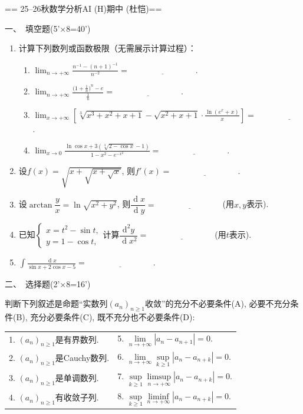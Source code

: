 == 25--26秋数学分析AI (H)期中 (杜恺)==

一、\ 填空题(5'×8=40')
\begin{enumerate}
    \item 计算下列数列或函数极限（无需展示计算过程）：
    \begin{enumerate}[label=(\arabic*)]
        \item $\displaystyle\lim_{n\to+\infty}\frac{n^{-1}-(n+1)^{-1}}{n^{-2}}=\underline{\hspace{8em}}$.
        \item $\displaystyle\lim_{n\to+\infty}\frac{\big(1+\frac{1}{n}\big)^n-e}{\frac{1}{n}}=\underline{\hspace{8em}}$.
        \item $\displaystyle\lim_{x\to+\infty}\left[\sqrt[3]{x^3+x^2+x+1}-\sqrt{x^2+x+1}\cdot\frac{\ln(e^x+x)}{x}\right]=\underline{\hspace{8em}}$.
        \item $\displaystyle\lim_{x\to0}\frac{\ln\cos x+3(\sqrt[3]{2-\cos x}-1)}{1-x^2-e^{-x^2}}=\underline{\hspace{8em}}$.
    \end{enumerate}
    \item 设$f(x)=\sqrt{x+\sqrt{x+\sqrt{x}}}$, 则$f'(x)=\underline{\hspace{8em}}$.
    \item 设$\arctan\dfrac{y}{x}=\ln\sqrt{x^2+y^2}$, 则$\dfrac{\operatorname{d}x}{\operatorname{d}y}=\underline{\hspace{8em}}$(用$x,y$表示).
    \item 已知$\begin{cases}x=t^2-\sin t,\\y=1-\cos t,\end{cases}$计算$\dfrac{\operatorname{d^2}y}{\operatorname{d}x^2}=\underline{\hspace{8em}}$(用$t$表示).
    \item $\displaystyle\int\frac{\operatorname{d}x}{\sin x+2\cos x-5}=\underline{\hspace{8em}}$.
\end{enumerate}

二、\ 选择题(2'×8=16')

判断下列叙述是命题“实数列$(a_n)_{n\geq1}$收敛”的充分不必要条件(A), 必要不充分条件(B), 充分必要条件(C), 既不充分也不必要条件(D):
\begin{center}\begin{tabular}{ll}
    1. $(a_n)_{n\geq1}$是有界数列. & 5. $\lim\limits_{n\to+\infty}|a_n-a_{n+1}|=0$.\\
    2. $(a_n)_{n\geq1}$是Cauchy数列. & 6. $\lim\limits_{n\to+\infty}\sup\limits_{k\geq1}|a_n-a_{n+k}|=0$.\\
    3. $(a_n)_{n\geq1}$是单调数列. & 7. $\sup\limits_{k\geq1}\limsup\limits_{n\to+\infty}|a_n-a_{n+k}|=0$.\\
    4. $(a_n)_{n\geq1}$有收敛子列. & 8. $\sup\limits_{k\geq1}\liminf\limits_{n\to+\infty}|a_n-a_{n+k}|=0$.
\end{tabular}\end{center}

